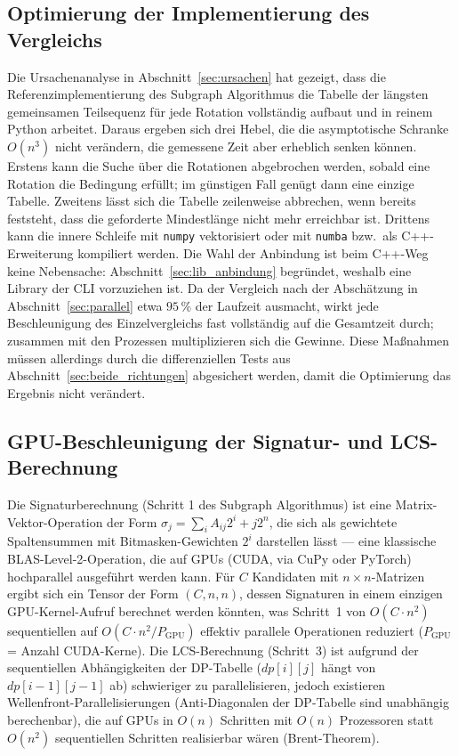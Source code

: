 \documentclass[a4paper,12pt, twoside]{report}
\theoremstyle{definition}
\begin{document}
\subsection{Optimierung der Implementierung des Vergleichs}
\label{sec:impl_opt}

Die Ursachenanalyse in Abschnitt~\ref{sec:ursachen} hat gezeigt, dass die Referenzimplementierung des Subgraph Algorithmus die Tabelle der längsten gemeinsamen Teilsequenz für jede Rotation vollständig aufbaut und in reinem Python arbeitet. Daraus ergeben sich drei Hebel, die die asymptotische Schranke $O(n^3)$ nicht verändern, die gemessene Zeit aber erheblich senken können. Erstens kann die Suche über die Rotationen abgebrochen werden, sobald eine Rotation die Bedingung erfüllt; im günstigen Fall genügt dann eine einzige Tabelle. Zweitens lässt sich die Tabelle zeilenweise abbrechen, wenn bereits feststeht, dass die geforderte Mindestlänge nicht mehr erreichbar ist. Drittens kann die innere Schleife mit \texttt{numpy} vektorisiert oder mit \texttt{numba} bzw.\ als C++-Erweiterung kompiliert werden. Die Wahl der Anbindung ist beim C++-Weg keine Nebensache: Abschnitt~\ref{sec:lib_anbindung} begründet, weshalb eine Library der CLI vorzuziehen ist. Da der Vergleich nach der Abschätzung in Abschnitt~\ref{sec:parallel} etwa $95\,\%$ der Laufzeit ausmacht, wirkt jede Beschleunigung des Einzelvergleichs fast vollständig auf die Gesamtzeit durch; zusammen mit den Prozessen multiplizieren sich die Gewinne. Diese Maßnahmen müssen allerdings durch die differenziellen Tests aus Abschnitt~\ref{sec:beide_richtungen} abgesichert werden, damit die Optimierung das Ergebnis nicht verändert.

\subsection{GPU-Beschleunigung der Signatur- und LCS-Berechnung}

Die Signaturberechnung (Schritt 1 des Subgraph Algorithmus) ist eine Matrix-Vektor-Operation der Form $\sigma_j = \sum_i A_{ij}2^i + j2^n$, die sich als gewichtete Spaltensummen mit Bitmasken-Gewichten $2^i$ darstellen lässt — eine klassische BLAS-Level-2-Operation, die auf GPUs (CUDA, via CuPy oder PyTorch) hochparallel ausgeführt werden kann. Für $C$ Kandidaten mit $n\times n$-Matrizen ergibt sich ein Tensor der Form $(C,n,n)$, dessen Signaturen in einem einzigen GPU-Kernel-Aufruf berechnet werden könnten, was Schritt~1 von $O(C\cdot n^2)$ sequentiellen auf $O(C\cdot n^2 / P_{\mathrm{GPU}})$ effektiv parallele Operationen reduziert ($P_{\mathrm{GPU}}$ = Anzahl CUDA-Kerne). Die LCS-Berechnung (Schritt~3) ist aufgrund der sequentiellen Abhängigkeiten der DP-Tabelle ($dp[i][j]$ hängt von $dp[i-1][j-1]$ ab) schwieriger zu parallelisieren, jedoch existieren Wellenfront-Parallelisierungen (Anti-Diagonalen der DP-Tabelle sind unabhängig berechenbar), die auf GPUs in $O(n)$ Schritten mit $O(n)$ Prozessoren statt $O(n^2)$ sequentiellen Schritten realisierbar wären (Brent-Theorem).
\end{document}

